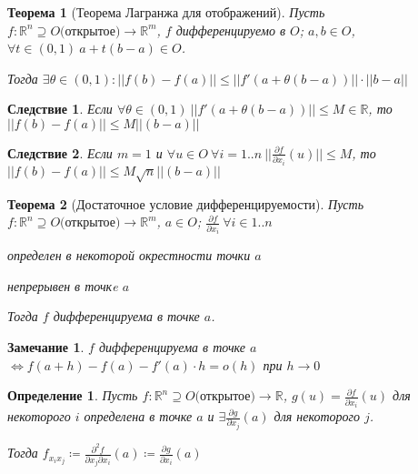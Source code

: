 \documentclass[11pt,a4paper,oneside]{scrartcl}
\newtheorem{definition}{Определение}
\newtheorem{theorem}{Теорема}
\newtheorem{consequence}{Следствие}
\newtheorem*{remark}{Замечание}
\begin{document}
\begin{theorem}[Теорема Лагранжа для отображений]    %
    Пусть $f: \mathbb{R}^n \supseteq O \text{(открытое)} \rightarrow \mathbb{R}^m$,
    $f$ дифференцируемо в $O$; $a, b \in O$, $\forall t \in (0, 1) \ a + t(b - a) \in O$.

    Тогда $\exists \theta \in (0, 1): ||f(b) - f(a)|| \leq ||f'(a + \theta(b - a))|| \cdot ||b-a||$
\end{theorem}

\setcounter{consequence}{0}
\begin{consequence}
    Если $\forall \theta \in (0, 1) \ ||f'(a + \theta(b - a))|| \leq M \in \mathbb{R}$,
    то $||f(b) - f(a)|| \leq M ||(b - a)||$
\end{consequence}
\begin{consequence}
    Если $m = 1$
    и $\forall u \in O \ \forall i = 1..n \ ||\frac{\partial f}{\partial x_i}(u)|| \leq M$,
    то $||f(b) - f(a)|| \leq M \sqrt{n} ||(b - a)||$
\end{consequence}

\begin{theorem}[Достаточное условие дифференцируемости]    %
    Пусть $f: \mathbb{R}^n \supseteq O \text{(открытое)} \rightarrow \mathbb{R}^m$, $a \in O$;
    $\frac{\partial f}{\partial x_i} \ \forall i \in 1..n$
    \begin{enumerate*} [label=\itshape\arabic*\upshape)]
        \item определен в некоторой окрестности точки $a$
        \item непрерывен в точкe $a$
    \end{enumerate*}

    Тогда $f$ дифференцируема в точке $a$.
\end{theorem}

\begin{remark}
    $f$ дифференцируема в точке $a$
    $\Leftrightarrow f(a + h) - f(a) - f'(a) \cdot h = o(h)$ при $h \rightarrow 0$
\end{remark}

\begin{definition}
    Пусть $f: \mathbb{R}^n \supseteq O \text{(открытое)} \rightarrow \mathbb{R}$,
    $g(u) = \frac{\partial f}{\partial x_i}(u)$ для некоторого $i$ определена в точке $a$
    и $\exists \frac{\partial g}{\partial x_j}(a)$ для некоторого $j$.

    Тогда $f_{x_i x_j} \coloneqq \frac{\partial^2 f}{\partial x_j \partial x_i}(a)
        \coloneqq \frac{\partial g}{\partial x_i}(a)$
\end{definition}
\end{document}
